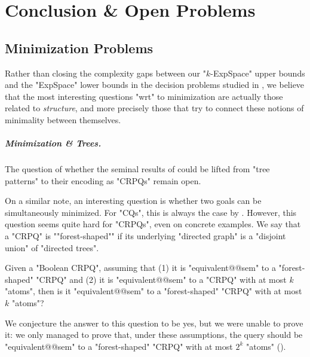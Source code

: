 \chapter[Conclusion \&~Open Problems]{Conclusion \& Open Problems}
\label{ch:conclu-database}
\renewcommand\thefigure{\thechapter.\arabic{figure}}

\begin{chapterpresentation}
	\begin{abstract}
		\todo{}
	\end{abstract}
		
	\par\bigskip\bigskip
	\chaptertoc
\end{chapterpresentation}

\section{Minimization Problems}

Rather than closing the complexity gaps between our "$k$-ExpSpace" upper bounds
and the "ExpSpace" lower bounds in the decision problems
studied in ,
we believe that the most interesting questions "wrt" to minimization
are actually those related to \emph{structure}, and more precisely those that try to
connect these notions of minimality between themselves.

\conjAtomVariableMinimal*

\paragraph*{Minimization \& Trees.}
The question of whether the seminal results of \cite{CzerwinskiMartensNiewerthParys2018Minimization} could be lifted from "tree patterns"
to their encoding as "CRPQs" remain open.
\conjTreePatternsAsCRPQs*

On a similar note, an interesting question is whether two goals can be simultaneously minimized.
For "CQs", this is always the case by . However, this question
seems quite hard for "CRPQs", even on concrete examples.
We say that a "CRPQ" is ""forest-shaped"" if its underlying "directed graph"
is a "disjoint union" of "directed trees".
\begin{question}
	Given a "Boolean CRPQ", assuming that (1) it is "equivalent@@sem" to
	a "forest-shaped" "CRPQ" and (2) it is "equivalent@@sem" to a "CRPQ"
  with at most $k$ "atoms", then is it "equivalent@@sem" to a 
  "forest-shaped" "CRPQ" with at most $k$ "atoms"?
\end{question}
We conjecture the answer to this question to be yes, but we were unable to prove it:
we only managed to prove that, under these assumptions, the query
should be "equivalent@@sem" to a "forest-shaped" "CRPQ" with at most $2^k$ "atoms"
().


